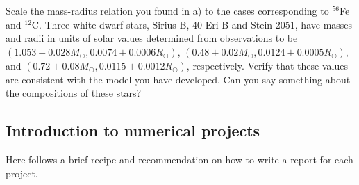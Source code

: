 \documentclass[%
oneside,                 %
final,                   %
10pt]{article}
\begin{document}
\noindent
Scale the mass-radius relation you found in a) to the cases corresponding to $^{56}$Fe and
$^{12}$C. Three white dwarf stars, Sirius B, 40 Eri B and Stein 2051, have masses and radii
in units of solar values determined from observations to be
$(1.053\pm0.028 M_{\odot},0.0074\pm 0.0006 R_{\odot})$, $(0.48\pm0.02 M_{\odot},0.0124\pm 0.0005 R_{\odot})$,
and $(0.72\pm0.08 M_{\odot},0.0115\pm 0.0012 R_{\odot})$, respectively.
Verify that these values are consistent with the model you have developed. Can you say something about the
compositions of these stars?



\subsection{Introduction to numerical projects}

Here follows a brief recipe and recommendation on how to write a report for each
project.
\end{document}
